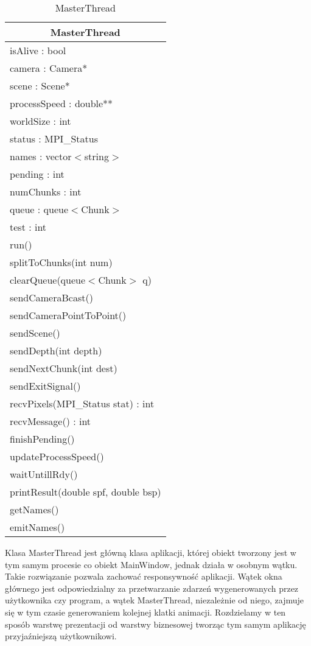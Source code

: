 \footnotesize
\begin{longtable}{|p{14cm}|}
    \caption{MasterThread} \label{tab:MasterThread} \\ \hline
    \multicolumn{1}{|c|}{MasterThread} \\ \hline
    isAlive : bool \\
    camera : Camera* \\
    scene : Scene* \\
    processSpeed : double** \\
    worldSize : int \\
    status : MPI\_Status \\
    names : vector$<$string$>$ \\
    pending : int \\
    numChunks : int \\
    queue : queue$<$Chunk$>$ \\
    test : int \\
    \hline
	run() \\
	splitToChunks(int num) \\
	clearQueue(queue$<$Chunk$>$ q) \\
    sendCameraBcast() \\
    sendCameraPointToPoint() \\
    sendScene() \\
    sendDepth(int depth) \\
    sendNextChunk(int dest) \\
    sendExitSignal() \\
    recvPixels(MPI\_Status stat) : int \\
    recvMessage() : int \\
    finishPending() \\
    updateProcessSpeed() \\
    waitUntillRdy() \\
    printResult(double spf, double bsp) \\
    getNames() \\
    emitNames() \\
	\hline
\end{longtable}
\normalsize

Klasa MasterThread jest główną klasa aplikacji, której obiekt tworzony jest w tym samym procesie co obiekt MainWindow, jednak działa w osobnym wątku. Takie rozwiązanie pozwala zachować responsywność aplikacji. Wątek okna głównego jest odpowiedzialny za przetwarzanie zdarzeń wygenerowanych przez użytkownika czy program, a wątek MasterThread, niezależnie od niego, zajmuje się w tym czasie generowaniem kolejnej klatki animacji. Rozdzielamy w ten sposób warstwę prezentacji od warstwy biznesowej tworząc tym samym aplikację przyjaźniejszą użytkownikowi.

